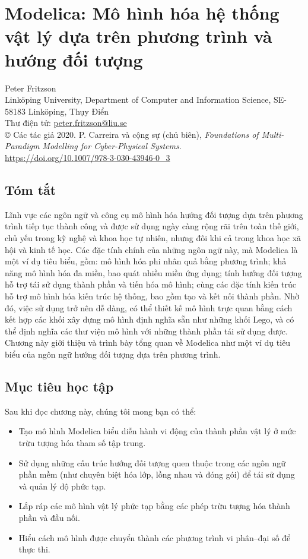 \chapter{Modelica: Mô hình hóa hệ thống vật lý dựa trên phương trình và hướng đối tượng}
\begin{flushleft}
\small
Peter Fritzson\\
Linköping University, Department of Computer and Information Science, SE-58183 Linköping, Thụy Điển\\
Thư điện tử: \url{peter.fritzson@liu.se}\\
\copyright{} Các tác giả 2020. P. Carreira và cộng sự (chủ biên), \emph{Foundations of Multi-Paradigm Modelling for Cyber-Physical Systems}.\\
\url{https://doi.org/10.1007/978-3-030-43946-0_3}
\end{flushleft}

\section*{Tóm tắt}
Lĩnh vực các ngôn ngữ và công cụ mô hình hóa hướng đối tượng dựa trên phương trình tiếp tục thành công và được sử dụng ngày càng rộng rãi trên toàn thế giới, chủ yếu trong kỹ nghệ và khoa học tự nhiên, nhưng đôi khi cả trong khoa học xã hội và kinh tế học. Các đặc tính chính của những ngôn ngữ này, mà Modelica là một ví dụ tiêu biểu, gồm: mô hình hóa phi nhân quả bằng phương trình; khả năng mô hình hóa đa miền, bao quát nhiều miền ứng dụng; tính hướng đối tượng hỗ trợ tái sử dụng thành phần và tiến hóa mô hình; cùng các đặc tính kiến trúc hỗ trợ mô hình hóa kiến trúc hệ thống, bao gồm tạo và kết nối thành phần. Nhờ đó, việc sử dụng trở nên dễ dàng, có thể thiết kế mô hình trực quan bằng cách kết hợp các khối xây dựng mô hình định nghĩa sẵn như những khối Lego, và có thể định nghĩa các thư viện mô hình với những thành phần tái sử dụng được. Chương này giới thiệu và trình bày tổng quan về Modelica như một ví dụ tiêu biểu của ngôn ngữ hướng đối tượng dựa trên phương trình.

\section*{Mục tiêu học tập}
Sau khi đọc chương này, chúng tôi mong bạn có thể:
\begin{itemize}
\item Tạo mô hình Modelica biểu diễn hành vi động của thành phần vật lý ở mức trừu tượng hóa tham số tập trung.
\item Sử dụng những cấu trúc hướng đối tượng quen thuộc trong các ngôn ngữ phần mềm (như chuyên biệt hóa lớp, lồng nhau và đóng gói) để tái sử dụng và quản lý độ phức tạp.
\item Lắp ráp các mô hình vật lý phức tạp bằng các phép trừu tượng hóa thành phần và đầu nối.
\item Hiểu cách mô hình được chuyển thành các phương trình vi phân--đại số để thực thi.
\end{itemize}

